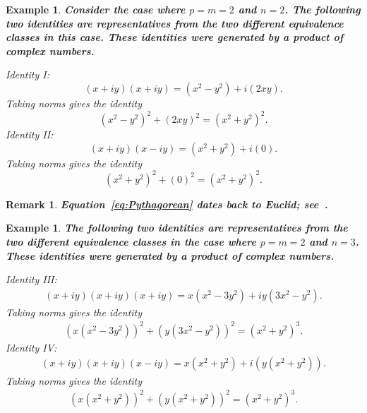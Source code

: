 \documentclass[12pt,table]{article}
\newtheorem{example}[theorem]{Example}
\newtheorem{remark}[theorem]{Remark}
\numberwithin{equation}{section}
\begin{document}
\begin{landscape}
{{\begin{example}
\bf
Consider the case where $ p = m = 2 $ and $ n = 2$.
The following two identities are representatives from 
the two different equivalence classes in this case. These identities
were generated by a product of complex numbers. 

\noindent
Identity I:
\begin{equation*}
(x + iy)(x + iy) = (x^2 - y^2 ) + i(2xy).
\end{equation*}
Taking norms gives the identity
\begin{equation}
\label{eq:Pythagorean}
    (x^2 - y^2 )^2 + (2xy)^2 
    = (x^2 + y^2)^2.
\end{equation}
Identity II:
\begin{equation*}
    (x + iy )(x - iy )
    = (x^2 + y^2 ) + i(0).
\end{equation*}
Taking norms gives the identity
\begin{equation}
    (x^2 + y^2 )^2 + (0)^2
    = (x^2 + y^2 )^2.
\end{equation}
\end{example}

\begin{remark}
\bf
Equation~\eqref{eq:Pythagorean} dates back to Euclid; see~\cite{Euclid}. 
\end{remark}

\begin{example}
\bf
The following two identities are representatives from 
the two different equivalence classes in the
case where $ p = m = 2 $ and $ n = 3$.
These identities
were generated by a product of complex numbers. 

\noindent
Identity III:
\begin{align*}
    (x + iy)(x + iy)(x + iy) 
    = x(x^2 - 3y^2) + i  y(3x^2 - y^2)  . 
    \end{align*}
Taking norms gives the identity
    \begin{align}
    (x(x^2 - 3y^2))^2 + (  y(3x^2 - y^2) )^2  
    = (x^2 + y^2)^3.
    \end{align}
Identity IV:
    \begin{align*}
    (x + iy )(x + iy)(x - iy ) 
    = x(x^2 + y^2 ) + i(y(x^2 + y^2))  .
    \end{align*}
Taking norms gives the identity
    \begin{align}
    ( x(x^2 + y^2) )^2 + ( y(x^2 + y^2) )^2 
    = (x^2 + y^2 )^3.
    \end{align}
\end{example}







}}
\end{landscape}
\end{document}
